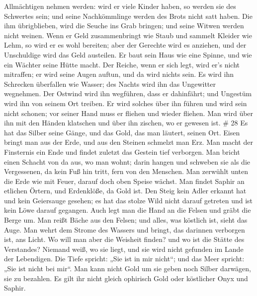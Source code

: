 Allmächtigen nehmen werden:  wird er viele Kinder haben, so
werden sie des Schwertes sein; und seine Nachkömmlinge werden des Brots
nicht satt haben.  Die ihm übrigblieben, wird die Seuche
ins Grab bringen; und seine Witwen werden nicht weinen. 
Wenn er Geld zusammenbringt wie Staub und sammelt Kleider wie Lehm,
 so wird er es wohl bereiten; aber der Gerechte wird es
anziehen, und der Unschuldige wird das Geld austeilen.  Er
baut sein Haus wie eine Spinne, und wie ein Wächter seine Hütte macht.
 Der Reiche, wenn er sich legt, wird er's nicht mitraffen;
er wird seine Augen auftun, und da wird nichts sein.  Es
wird ihn Schrecken überfallen wie Wasser; des Nachts wird ihn das
Ungewitter wegnehmen.  Der Ostwind wird ihn wegführen, dass
er dahinfährt; und Ungestüm wird ihn von seinem Ort treiben.
 Er wird solches über ihn führen und wird sein nicht
schonen; vor seiner Hand muss er fliehen und wieder fliehen.
 Man wird über ihn mit den Händen klatschen und über ihn
zischen, wo er gewesen ist. \# 28  Es hat das Silber seine
Gänge, und das Gold, das man läutert, seinen Ort.  Eisen
bringt man aus der Erde, und aus den Steinen schmelzt man Erz.
 Man macht der Finsternis ein Ende und findet zuletzt das
Gestein tief verborgen.  Man bricht einen Schacht von da
aus, wo man wohnt; darin hangen und schweben sie als die Vergessenen, da
kein Fuß hin tritt, fern von den Menschen.  Man zerwühlt
unten die Erde wie mit Feuer, darauf doch oben Speise wächst.
 Man findet Saphir an etlichen Örtern, und Erdenklöße, da
Gold ist.  Den Steig kein Adler erkannt hat und kein
Geiersauge gesehen;  es hat das stolze Wild nicht darauf
getreten und ist kein Löwe darauf gegangen.  Auch legt man
die Hand an die Felsen und gräbt die Berge um.  Man reißt
Bäche aus den Felsen; und alles, was köstlich ist, sieht das Auge.
 Man wehrt dem Strome des Wassers und bringt, das darinnen
verborgen ist, ans Licht.  Wo will man aber die Weisheit
finden? und wo ist die Stätte des Verstandes?  Niemand
weiß, wo sie liegt, und sie wird nicht gefunden im Lande der Lebendigen.
 Die Tiefe spricht: „Sie ist in mir nicht``; und das Meer
spricht: „Sie ist nicht bei mir``.  Man kann nicht Gold um
sie geben noch Silber darwägen, sie zu bezahlen.  Es gilt
ihr nicht gleich ophirisch Gold oder köstlicher Onyx und Saphir.
